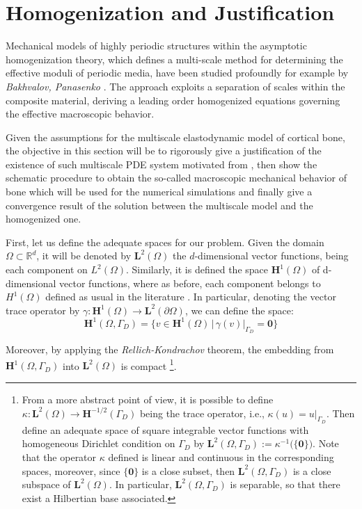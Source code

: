 \chapter{Homogenization and Justification}

Mechanical models of highly periodic structures within the asymptotic homogenization theory, which defines a multi-scale method for determining the effective moduli of periodic media, have been studied profoundly for example by \textit{Bakhvalov, Panasenko} \cite{bakhvalov1989homogenisation:}. The approach exploits a separation of scales within the composite material, deriving a leading order homogenized equations governing the effective macroscopic behavior.

Given the assumptions for the multiscale elastodynamic model of cortical bone, the objective in this section will be to rigorously give a justification of the existence of such multiscale PDE system motivated from \cite{altenbach2018generalized}, \cite{Parnell2008} then show the schematic procedure to obtain the so-called macroscopic mechanical behavior of bone which will be used for the numerical simulations and finally give a convergence result of the solution between the multiscale model and the homogenized one. 

First, let us define the adequate spaces for our problem. Given the domain $\Omega \subset \mathbb{R}^d$, it will be denoted by $\mathbf{L}^2(\Omega)$ the $d$-dimensional vector functions, being each component on $L^2(\Omega)$. Similarly, it is defined the space $\mathbf{H}^1(\Omega)$ of d-dimensional vector functions, where as before, each component belongs to $H^1(\Omega)$ defined as usual in the literature \cite{evans2010partial}. 
In particular, denoting the vector trace operator by $\gamma: \mathbf{H}^1(\Omega) \rightarrow \mathbf{L}^2(\partial \Omega)$, we can define the space:
\begin{equation*}
    \mathbf{H}^1(\Omega, \Gamma_D) = \big \{ v \in \mathbf{H}^1(\Omega) \, \vert \, \gamma (v) \vert_{\Gamma_D} = \mathbf{0} \big \}
\end{equation*}

Moreover, by applying the \textit{Rellich-Kondrachov} theorem, the embedding from $\mathbf{H}^1(\Omega, \Gamma_D)$ into $\mathbf{L}^2(\Omega)$ is compact \footnote{From a more abstract point of view, it is possible to define $\kappa: \mathbf{L}^2( \Omega) \longrightarrow \mathbf{H}^{-1/2}(\Gamma_D)$ being the trace operator, i.e., $\kappa (u) = u \vert_{\Gamma_D}$. Then define an adequate space of square integrable vector functions with homogeneous Dirichlet condition on $\Gamma_D$ by $\mathbf{L}^2(\Omega, \Gamma_D) := \kappa^{-1}\big( \{ \mathbf{0}\}\big)$. Note that the operator $\kappa$ defined is linear and continuous in the corresponding spaces, moreover, since $\{\mathbf{0}\}$ is a close subset, then $\mathbf{L}^2(\Omega, \Gamma_D)$ is a close subspace of $\mathbf{L}^2(\Omega)$.
In particular, $\mathbf{L}^2(\Omega, \Gamma_D)$ is separable, so that there exist a Hilbertian base associated.}.

